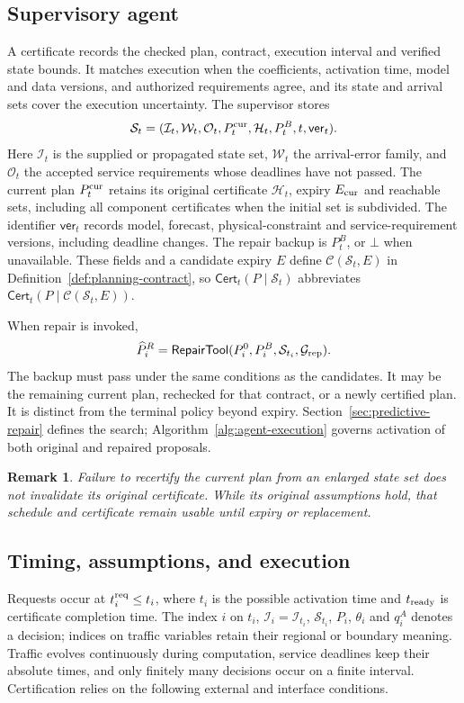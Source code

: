 \documentclass[preprint,12pt]{elsarticle}
\theoremstyle{definition}
\theoremstyle{plain}
\newtheorem{remark}{Remark}
\theoremstyle{definition}
\theoremstyle{plain}
\begin{document}
\subsection{Supervisory agent}
\label{sec:supervisory-agent}
A certificate records the checked plan, contract, execution interval and
verified state bounds. It matches execution when the coefficients,
activation time, model and data versions, and authorized requirements
agree, and its state and arrival sets cover the execution uncertainty.
The supervisor stores
\[
\mathcal S_t=(\mathcal I_t,\mathcal W_t,\mathcal O_t,
P_t^{\rm cur},\mathcal H_t,P_t^B,t,\mathsf{ver}_t).
\]
Here $\mathcal I_t$ is the supplied or propagated state set,
$\mathcal W_t$ the arrival-error family, and $\mathcal O_t$ the accepted
service requirements whose deadlines have not passed. The current plan
$P_t^{\rm cur}$ retains its original certificate $\mathcal H_t$, expiry
$E_{\rm cur}$ and reachable sets, including all component certificates
when the initial set is subdivided. The identifier $\mathsf{ver}_t$
records model, forecast, physical-constraint and service-requirement
versions, including deadline changes. The repair backup is $P_t^B$, or
$\bot$ when unavailable. These fields and a candidate expiry $E$ define
$\mathcal C(\mathcal S_t,E)$ in Definition~\ref{def:planning-contract}, so
$\mathsf{Cert}_t(P\mid\mathcal S_t)$ abbreviates
$\mathsf{Cert}_t(P\mid\mathcal C(\mathcal S_t,E))$.

When repair is invoked,
\begin{equation}
\widehat P_i^R=\mathsf{RepairTool}
(P_i^0,P_i^B,\mathcal S_{t_i},\mathcal G_{\rm rep}).
\label{eq:repair-tool-interface}
\end{equation}
The backup must pass under the same conditions as the candidates. It may
be the remaining current plan, rechecked for that contract, or a newly
certified plan. It is distinct from the terminal policy beyond expiry.
Section~\ref{sec:predictive-repair} defines the search; Algorithm~\ref{alg:agent-execution}
governs activation of both original and repaired proposals.

\begin{remark}
Failure to recertify the current plan from an enlarged state set does not
invalidate its original certificate. While its original assumptions hold,
that schedule and certificate remain usable until expiry or replacement.
\end{remark}

\subsection{Timing, assumptions, and execution}
\label{sec:execution-interface}
Requests occur at $t_i^{\rm req}\le t_i$, where $t_i$ is the possible
activation time and $t_{\rm ready}$ is certificate completion time.
The index $i$ on $t_i$, $\mathcal I_i=\mathcal I_{t_i}$,
$\mathcal S_{t_i}$, $P_i$, $\theta_i$ and $q_i^A$ denotes a decision;
indices on traffic variables retain their regional or boundary meaning.
Traffic evolves continuously during computation, service deadlines keep
their absolute times, and only finitely many decisions occur on a finite
interval. Certification relies on the following external and interface
conditions.
\end{document}
